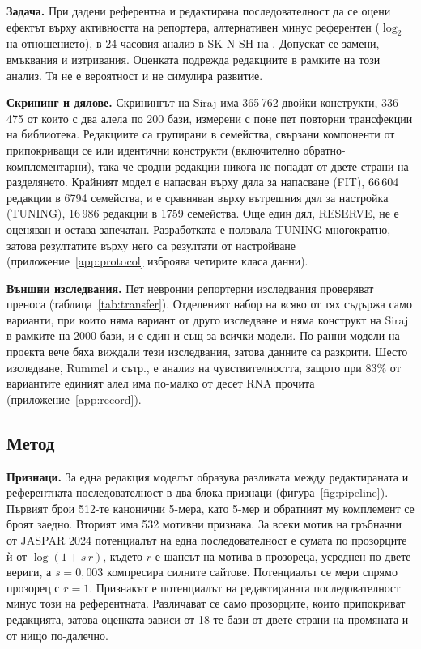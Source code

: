 \documentclass[10.5pt,a4paper]{article}
\begin{document}
\textbf{Задача.} При дадени референтна и редактирана последователност да се оцени ефектът върху активността на репортера, алтернативен минус референтен ($\log_2$ на отношението), в 24-часовия анализ в SK-N-SH на \citet{siraj2026}. Допускат се замени, вмъквания и изтривания. Оценката подрежда редакциите в рамките на този анализ. Тя не е вероятност и не симулира развитие.

\textbf{Скрининг и дялове.} Скринингът на Siraj има 365\,762 двойки конструкти, 336\,475 от които с два алела по 200 бази, измерени с поне пет повторни трансфекции на библиотека. Редакциите са групирани в семейства, свързани компоненти от припокриващи се или идентични конструкти (включително обратно-комплементарни), така че сродни редакции никога не попадат от двете страни на разделянето. Крайният модел е напасван върху дяла за напасване (FIT), 66\,604 редакции в 6794 семейства, и е сравняван върху вътрешния дял за настройка (TUNING), 16\,986 редакции в 1759 семейства. Още един дял, RESERVE, не е оценяван и остава запечатан. Разработката е ползвала TUNING многократно, затова резултатите върху него са резултати от настройване (приложение~\ref{app:protocol} изброява четирите класа данни).

\textbf{Външни изследвания.} Пет невронни репортерни изследвания проверяват преноса (таблица~\ref{tab:transfer}). Отделеният набор на всяко от тях съдържа само варианти, при които няма вариант от друго изследване и няма конструкт на Siraj в рамките на 2000 бази, и е един и същ за всички модели. По-ранни модели на проекта вече бяха виждали тези изследвания, затова данните са разкрити. Шесто изследване, Rummel и сътр., е анализ на чувствителността, защото при 83\% от вариантите единият алел има по-малко от десет RNA прочита (приложение~\ref{app:record}).

\subsection{Метод}\label{sec:method}

\textbf{Признаци.} За една редакция моделът образува разликата между редактираната и референтната последователност в два блока признаци (фигура~\ref{fig:pipeline}). Първият брои 512-те канонични 5-мера, като 5-мер и обратният му комплемент се броят заедно. Вторият има 532 мотивни признака. За всеки мотив на гръбначни от JASPAR 2024 \citep{rauluseviciute2024} потенциалът на една последователност е сумата по прозорците ѝ от $\log(1+s\,r)$, където $r$ е шансът на мотива в прозореца, усреднен по двете вериги, а $s=0{,}003$ компресира силните сайтове. Потенциалът се мери спрямо прозорец с $r=1$. Признакът е потенциалът на редактираната последователност минус този на референтната. Различават се само прозорците, които припокриват редакцията, затова оценката зависи от 18-те бази от двете страни на промяната и от нищо по-далечно.
\end{document}
